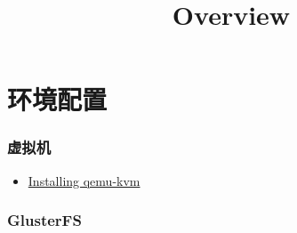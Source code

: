 \documentclass{article}
\title{Overview}
\date{}
\begin{document}
\maketitle

\tableofcontents
\newpage
\part{环境配置}
\section{虚拟机}
\begin{itemize}
\item \href{https://www.howtogeek.com/117635/how-to-install-kvm-and-create-virtual-machines-on-ubuntu/}{Installing qemu-kvm}

\end{itemize}
\section{GlusterFS}
\end{document}
